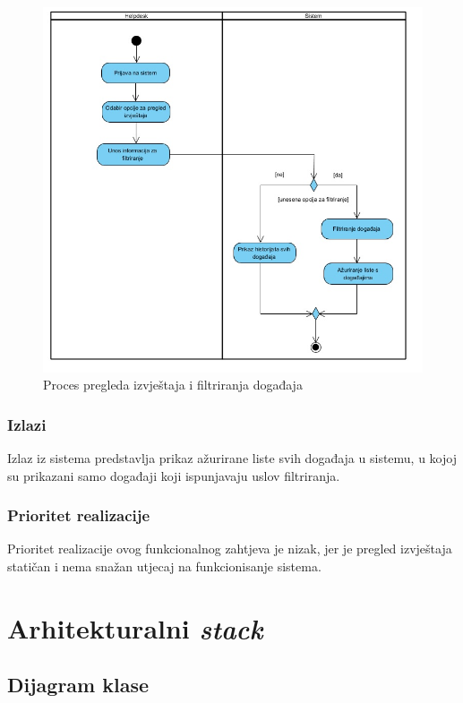 \documentclass[12pt,a4paper]{article}
\begin{document}
\begin{figure}[H]
\center
\includegraphics[scale=0.5]{../res/Activity/activity12.JPG}
\caption{Proces pregleda izvještaja i filtriranja događaja}
\label{act12}
\end{figure}

\subsubsection{Izlazi}

Izlaz iz sistema predstavlja prikaz ažurirane liste svih događaja u sistemu, u kojoj su prikazani samo događaji koji ispunjavaju uslov filtriranja.

\subsubsection{Prioritet realizacije}

Prioritet realizacije ovog funkcionalnog zahtjeva je nizak, jer je pregled izvještaja statičan i nema snažan utjecaj na funkcionisanje sistema.

\newpage

\section{Arhitekturalni \textit{stack}}

\subsection{Dijagram klase}
\end{document}

